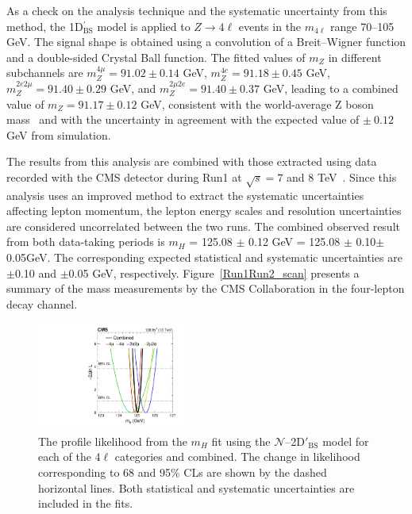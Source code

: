 As a check on the analysis technique and the systematic uncertainty from this method, the 
1D$^{'}_\text{BS}$ model is applied to $Z \to 4\ell$ events in the $m_{4\ell}$ range 70--105  GeV. The signal shape is obtained using a convolution of a Breit--Wigner function and a double-sided Crystal Ball function.
The fitted values of $m_Z$ in different subchannels are $m_Z^{4\mu} = 91.02 \pm 0.14$ GeV, $m_Z^{4e} = 91.18 \pm 0.45$ GeV, $m_Z^{2e2\mu} = 91.40 \pm 0.29$ GeV, and $m_Z^{2\mu2e} = 91.40 \pm 0.37$ GeV, leading to a combined value of $m_Z = 91.17 \pm 0.12$ GeV, consistent with the world-average Z boson mass~\cite{Agashe:2014kda} and with the uncertainty in agreement with the expected value of $\pm~0.12$ GeV from simulation.

The results from this analysis are combined with those extracted using data recorded with the  
CMS detector during Run1 at $\sqrt{s}= 7$ and 8 TeV~\cite{Chatrchyan:2013mxa}. 
Since this analysis uses an improved method to extract the systematic uncertainties affecting lepton momentum, 
the lepton energy scales and resolution uncertainties are considered uncorrelated between the two runs. The combined observed result from
both data-taking periods is $m_H$ = 125.08 $\pm$ 0.12 GeV = 125.08 $\pm$ 0.10\stat $\pm$ 0.05\syst GeV.
The corresponding expected statistical and systematic uncertainties are $\pm$0.10 and $\pm$0.05 GeV, respectively. 
Figure~\ref{Run1Run2_scan} presents a summary of the \Hboson mass measurements by the CMS Collaboration in the four-lepton decay channel.
\begin{figure}[!htb]
  \centering
  \includegraphics[width=0.45\textwidth]{Figure_008.pdf}
  \caption{The profile likelihood from the $m_H$ fit using the $\mathcal{N}$--2D$'_\text{BS}$ model for each of the 4$\ell$ categories and combined.  The change in likelihood corresponding to 68 and 95\% CLs are shown by the dashed horizontal lines. Both statistical and systematic uncertainties are included in the fits.}
  \label{MassLikelihoodScan}
\end{figure}

